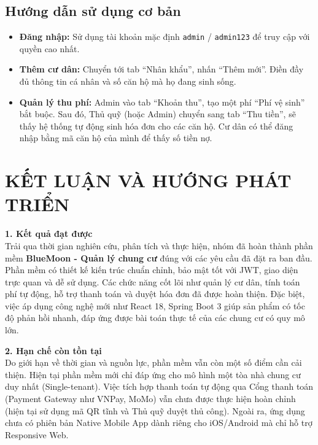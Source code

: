 \documentclass[12pt,a4paper]{article}
\begin{document}
\subsection{Hướng dẫn sử dụng cơ bản}
\begin{itemize}
    \item \textbf{Đăng nhập:} Sử dụng tài khoản mặc định \texttt{admin} / \texttt{admin123} để truy cập với quyền cao nhất.
    \item \textbf{Thêm cư dân:} Chuyển tới tab ``Nhân khẩu'', nhấn ``Thêm mới''. Điền đầy đủ thông tin cá nhân và số căn hộ mà họ đang sinh sống.
    \item \textbf{Quản lý thu phí:} Admin vào tab ``Khoản thu'', tạo một phí ``Phí vệ sinh'' bắt buộc. Sau đó, Thủ quỹ (hoặc Admin) chuyển sang tab ``Thu tiền'', sẽ thấy hệ thống tự động sinh hóa đơn cho các căn hộ. Cư dân có thể đăng nhập bằng mã căn hộ của mình để thấy số tiền nợ.
\end{itemize}

\newpage
\section*{KẾT LUẬN VÀ HƯỚNG PHÁT TRIỂN}

\textbf{1. Kết quả đạt được} \\
Trải qua thời gian nghiên cứu, phân tích và thực hiện, nhóm đã hoàn thành phần mềm \textbf{BlueMoon - Quản lý chung cư} đúng với các yêu cầu đã đặt ra ban đầu. Phần mềm có thiết kế kiến trúc chuẩn chỉnh, bảo mật tốt với JWT, giao diện trực quan và dễ sử dụng. Các chức năng cốt lõi như quản lý cư dân, tính toán phí tự động, hỗ trợ thanh toán và duyệt hóa đơn đã được hoàn thiện. Đặc biệt, việc áp dụng công nghệ mới như React 18, Spring Boot 3 giúp sản phẩm có tốc độ phản hồi nhanh, đáp ứng được bài toán thực tế của các chung cư có quy mô lớn.

\textbf{2. Hạn chế còn tồn tại} \\
Do giới hạn về thời gian và nguồn lực, phần mềm vẫn còn một số điểm cần cải thiện. Hiện tại phần mềm mới chỉ đáp ứng cho mô hình một tòa nhà chung cư duy nhất (Single-tenant). Việc tích hợp thanh toán tự động qua Cổng thanh toán (Payment Gateway như VNPay, MoMo) vẫn chưa được thực hiện hoàn chỉnh (hiện tại sử dụng mã QR tĩnh và Thủ quỹ duyệt thủ công). Ngoài ra, ứng dụng chưa có phiên bản Native Mobile App dành riêng cho iOS/Android mà chỉ hỗ trợ Responsive Web.
\end{document}
